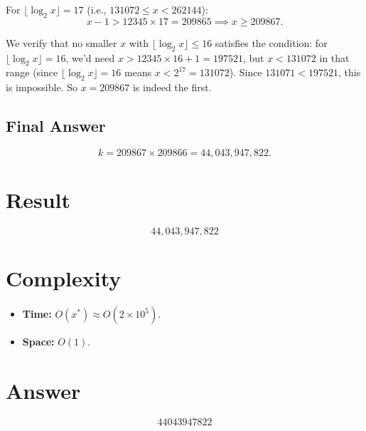 \documentclass[12pt]{article}
\begin{document}
For $\lfloor \log_2 x \rfloor = 17$ (i.e., $131072 \leq x < 262144$):
\[
x - 1 > 12345 \times 17 = 209865 \implies x \geq 209867.
\]

We verify that no smaller $x$ with $\lfloor \log_2 x \rfloor \leq 16$ satisfies the condition:
for $\lfloor \log_2 x \rfloor = 16$, we'd need $x > 12345 \times 16 + 1 = 197521$, but $x < 131072$ in that range (since $\lfloor \log_2 x \rfloor = 16$ means $x < 2^{17} = 131072$). Since $131071 < 197521$, this is impossible. So $x = 209867$ is indeed the first.

\subsection{Final Answer}
\[
k = 209867 \times 209866 = 44{,}043{,}947{,}822.
\]

\section{Result}
\[
\boxed{44{,}043{,}947{,}822}
\]

\section{Complexity}
\begin{itemize}
    \item \textbf{Time:} $O(x^*) \approx O(2 \times 10^5)$.
    \item \textbf{Space:} $O(1)$.
\end{itemize}

\section{Answer}

\[
\boxed{44043947822}
\]
\end{document}
